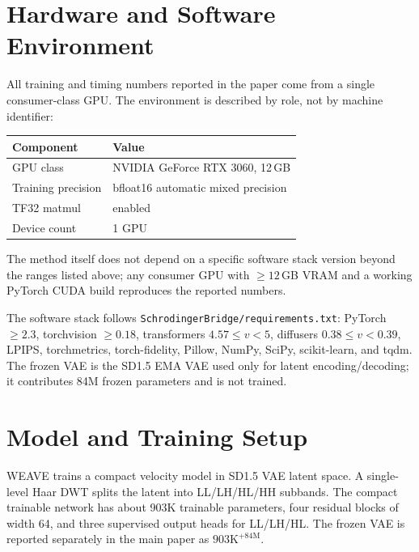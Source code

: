 \documentclass[10pt,twocolumn]{article}
\newcommand{\weave}{WEAVE}
\begin{document}
\section{Hardware and Software Environment}

All training and timing numbers reported in the paper come from a single consumer-class
GPU. The environment is described by role, not by machine identifier:

\begin{center}
\begin{tabular}{ll}
\toprule
Component & Value \\
\midrule
GPU class & NVIDIA GeForce RTX 3060, 12\,GB \\
Training precision & bfloat16 automatic mixed precision \\
TF32 matmul & enabled \\
Device count & 1 GPU \\
\bottomrule
\end{tabular}
\end{center}

The method itself does not depend on a specific software stack version beyond the ranges listed above; any
consumer GPU with $\geq 12$\,GB VRAM and a working PyTorch CUDA build reproduces the
reported numbers.

The software stack follows \texttt{SchrodingerBridge/requirements.txt}: PyTorch
\(\ge 2.3\), torchvision \(\ge 0.18\), transformers \(4.57 \le v < 5\), diffusers
\(0.38 \le v < 0.39\), LPIPS, torchmetrics, torch-fidelity, Pillow, NumPy, SciPy,
scikit-learn, and tqdm. The frozen VAE is the SD1.5 EMA VAE used only for latent
encoding/decoding; it contributes 84M frozen parameters and is not trained.

\section{Model and Training Setup}

\weave{} trains a compact velocity model in SD1.5 VAE latent space. A single-level Haar
DWT splits the latent into LL/LH/HL/HH subbands. The compact trainable network has about
903K trainable parameters, four residual blocks of width 64, and three supervised output
heads for LL/LH/HL. The frozen VAE is reported separately in the main paper as
\(903\mathrm{K}^{+84\mathrm{M}}\).
\end{document}

